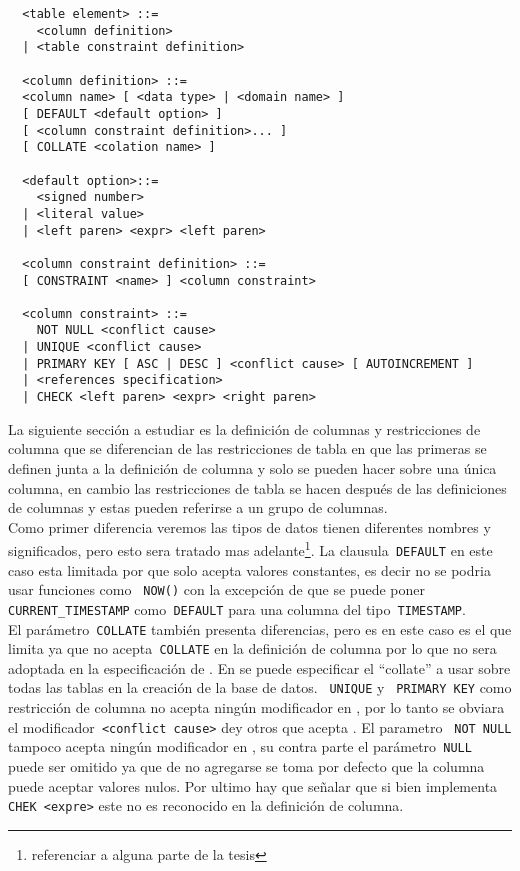 \begin{Verbatim}
  <table element> ::=
    <column definition>
  | <table constraint definition>

  <column definition> ::=
  <column name> [ <data type> | <domain name> ]
  [ DEFAULT <default option> ]
  [ <column constraint definition>... ]
  [ COLLATE <colation name> ]

  <default option>::=
    <signed number>
  | <literal value>
  | <left paren> <expr> <left paren>
  
  <column constraint definition> ::=
  [ CONSTRAINT <name> ] <column constraint>

  <column constraint> ::=
    NOT NULL <conflict cause>
  | UNIQUE <conflict cause>
  | PRIMARY KEY [ ASC | DESC ] <conflict cause> [ AUTOINCREMENT ]
  | <references specification>
  | CHECK <left paren> <expr> <right paren>
\end{Verbatim}

La siguiente sección a estudiar es la definición de columnas y restricciones de columna que se diferencian de las restricciones de tabla en que las primeras se definen junta a la definición de columna y solo se pueden hacer sobre una única columna, en cambio las restricciones de tabla se hacen después de las definiciones de columnas y estas pueden referirse a un grupo de columnas.\\

Como primer diferencia veremos las tipos de datos tienen diferentes nombres y significados, pero esto sera tratado mas adelante\footnote{referenciar a alguna parte de la tesis}. La clausula\verb= DEFAULT= en este caso esta limitada por \m que solo acepta valores constantes, es decir no se podria usar funciones como \verb= NOW()= con la excepción de que se puede poner\verb= CURRENT_TIMESTAMP= como\verb= DEFAULT= para una columna del tipo\verb= TIMESTAMP=.\\

El parámetro\verb= COLLATE= también presenta diferencias, pero es en este caso es \p el que limita ya que no acepta\verb= COLLATE= en la definición de columna por lo que no sera adoptada en la especificación de \cc. En \p se puede especificar el ``collate'' a usar sobre todas las tablas en la creación de la base de datos. \verb= UNIQUE= y \verb= PRIMARY KEY= como restricción de columna no acepta ningún modificador en \m, por lo tanto se obviara el modificador\verb= <conflict cause>= de\s y otros que acepta \p. El parametro \verb= NOT NULL= tampoco acepta ningún modificador en \m, su contra parte el parámetro\verb= NULL= puede ser omitido ya que de no agregarse se toma por defecto que la columna puede aceptar valores nulos. Por ultimo hay que señalar que \m si bien implementa\verb= CHEK <expre>= este no es reconocido en la definición de columna.\\

